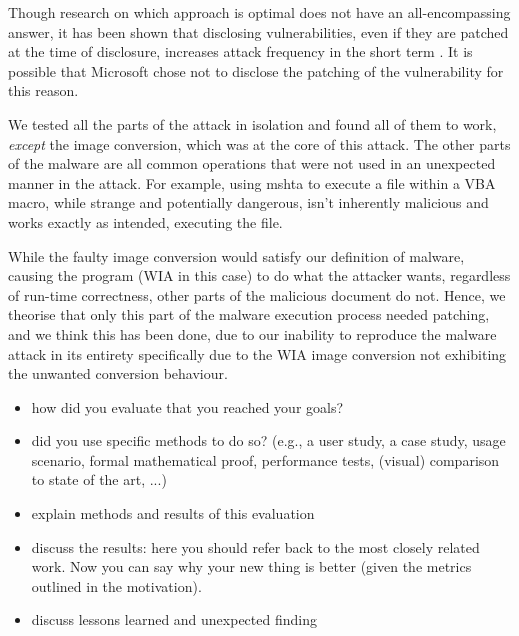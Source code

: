 Though research on which approach is optimal does not have an all-encompassing answer, it has been shown that disclosing 
vulnerabilities, even if they are patched at the time of disclosure, increases attack frequency in the short term 
\cite{vuln-disclosure, vuln-disclosure-impact}. It is possible that Microsoft chose not to disclose the patching of 
the vulnerability for this reason.

We tested all the parts of the attack in isolation and found all of them to work, \emph{except} the image conversion,
which was at the core of this attack. The other parts of the malware are all common operations that were not used in 
an unexpected manner in the attack. For example, using \acrshort{mshta} to execute a file within a \acrshort{VBA} macro,
while strange and potentially dangerous, isn't inherently malicious and works exactly as intended, executing the file.

While the faulty image conversion would satisfy our definition of malware, causing the program (\acrshort{WIA} in this case) 
to do what the attacker wants, regardless of run-time correctness, other parts of the malicious document do not. Hence,
we theorise that only this part of the malware execution process needed patching, and we think this has been done, due
to our inability to reproduce the malware attack in its entirety specifically due to the \acrshort{WIA} image conversion
not exhibiting the unwanted conversion behaviour.


\clearpage
\begin{itemize}
    \item how did you evaluate that you reached your goals?
    \item did you use specific methods to do so? (e.g., a user study, a case study, usage scenario, 
    formal mathematical proof, performance tests, (visual) comparison to state of the art, ...)
    \item explain methods and results of this evaluation
    \item discuss the results: here you should refer back to the most closely related work. Now
    you can say why your new thing is better (given the metrics outlined in the
    motivation).
    \item discuss lessons learned and unexpected finding
\end{itemize}
\clearpage
